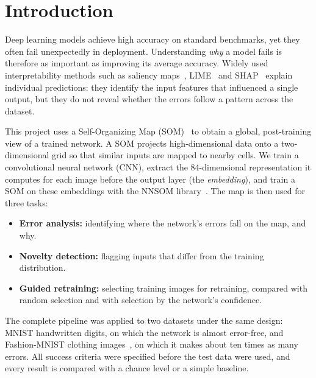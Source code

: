 \documentclass{scrartcl}
\begin{document}
\tableofcontents
\newpage
\section{Introduction}

Deep learning models achieve high accuracy on standard benchmarks, yet they often fail unexpectedly in deployment. Understanding \emph{why} a model fails is therefore as important as improving its average accuracy. Widely used interpretability methods such as saliency maps~\cite{simonyan2014saliency}, LIME~\cite{ribeiro2016lime} and SHAP~\cite{lundberg2017shap} explain individual predictions: they identify the input features that influenced a single output, but they do not reveal whether the errors follow a pattern across the dataset.

This project uses a Self-Organizing Map (SOM)~\cite{kohonen1990som} to obtain a global, post-training view of a trained network. A SOM projects high-dimensional data onto a two-dimensional grid so that similar inputs are mapped to nearby cells. We train a convolutional neural network (CNN), extract the 84-dimensional representation it computes for each image before the output layer (the \emph{embedding}), and train a SOM on these embeddings with the NNSOM library~\cite{jafari_nnsom}. The map is then used for three tasks:
\begin{itemize}
  \item \textbf{Error analysis:} identifying where the network's errors fall on the map, and why.
  \item \textbf{Novelty detection:} flagging inputs that differ from the training distribution.
  \item \textbf{Guided retraining:} selecting training images for retraining, compared with random selection and with selection by the network's confidence.
\end{itemize}

The complete pipeline was applied to two datasets under the same design: MNIST handwritten digits, on which the network is almost error-free, and Fashion-MNIST clothing images~\cite{xiao2017fashion}, on which it makes about ten times as many errors. All success criteria were specified before the test data were used, and every result is compared with a chance level or a simple baseline.
\end{document}
